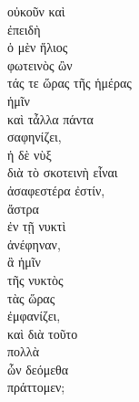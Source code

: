 {\large
\begin{greek}
\noindent οὐκοῦν καὶ \\
ἐπειδὴ \\
ὁ μὲν ἥλιος \\
\tabto{2em} φωτεινὸς ὢν \\
τάς τε ὥρας τῆς ἡμέρας \\
\tabto{2em} ἡμῖν \\
καὶ τἆλλα πάντα \\
σαφηνίζει,\\
ἡ δὲ νὺξ \\
\tabto{2em} διὰ τὸ σκοτεινὴ εἶναι \\
ἀσαφεστέρα ἐστίν, \\
ἄστρα \\
\tabto{2em} ἐν τῇ νυκτὶ \\
ἀνέφηναν, \\
ἃ ἡμῖν \\
\tabto{6em} τῆς νυκτὸς \\
\tabto{4em} τὰς ὥρας \\
\tabto{2em} ἐμφανίζει, \\
καὶ διὰ τοῦτο \\
πολλὰ \\
\tabto{2em} ὧν δεόμεθα \\
πράττομεν;\\

\end{greek}
}

